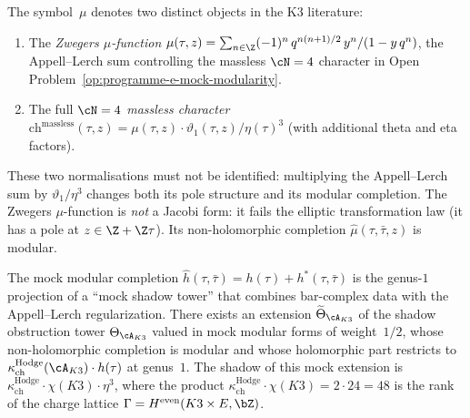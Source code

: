 \begin{remark}
\label{rem:mu-overloaded}
The symbol~$\mu$ denotes two distinct objects in the K3 literature:
\begin{enumerate}[label=\textup{(\roman*)}]
\item The \emph{Zwegers $\mu$-function}
 $\mu(\tau, z) = \sum_{n \in \Z}
 (-1)^n\,q^{n(n+1)/2}\,y^n/(1 - y\,q^n)$, the Appell--Lerch sum
 controlling the massless $\cN = 4$ character
 in Open Problem~\ref{op:programme-e-mock-modularity}.
\item The full \emph{$\cN = 4$ massless character}
 $\mathrm{ch}^{\mathrm{massless}}(\tau, z)
 = \mu(\tau, z) \cdot \vartheta_1(\tau, z)/\eta(\tau)^3$
 (with additional theta and eta factors).
\end{enumerate}
These two normalisations must not be identified: multiplying the
Appell--Lerch sum by \(\vartheta_1/\eta^3\) changes both its pole
structure and its modular completion.
The Zwegers $\mu$-function is \emph{not} a Jacobi form: it fails
the elliptic transformation law (it has a pole at
$z \in \Z + \Z\tau$). Its non-holomorphic completion
$\hat{\mu}(\tau, \bar\tau, z)$ is modular.
\end{remark}

\begin{conjecture}
\label{conj:mock-shadow-tower}
\ClaimStatusConjectured
{}
The mock modular completion
$\hat{h}(\tau,\bar\tau) = h(\tau) + h^*(\tau,\bar\tau)$
is the genus-$1$ projection of a ``mock shadow tower''
that combines bar-complex data with the Appell--Lerch
regularization. There exists an extension
$\widetilde{\Theta}_{\cA_{K3}}$ of the shadow
obstruction tower $\Theta_{\cA_{K3}}$ valued in mock
modular forms of weight~$1/2$, whose non-holomorphic
completion is modular and whose holomorphic part restricts
to $\kappa_{\mathrm{ch}}^{\mathrm{Hodge}}(\cA_{K3}) \cdot h(\tau)$ at genus~$1$.
The shadow of this mock extension is
$\kappa_{\mathrm{ch}}^{\mathrm{Hodge}} \cdot \chi(K3) \cdot \eta^3$,
where the product $\kappa_{\mathrm{ch}}^{\mathrm{Hodge}} \cdot \chi(K3) = 2 \cdot 24 = 48$
is the rank of the charge lattice
$\Gamma = H^{\mathrm{even}}(K3 \times E, \bZ)$.
\end{conjecture}

